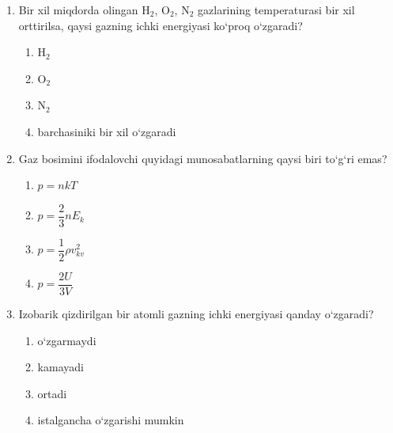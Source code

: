 \begin{enumerate}

\begin{enumerate}[label=\Alph*)]
\item 227
\item 375
\item 250
\item 500

\end{enumerate}

\item Bir xil miqdorda olingan H$_2$, O$_2$, N$_2$ gazlarining temperaturasi bir xil orttirilsa, qaysi gazning ichki energiyasi ko‘proq o‘zgaradi?
\begin{enumerate}[label=\Alph*)]
\item H$_2$
\item O$_2$
\item N$_2$
\item barchasiniki bir xil o‘zgaradi

\end{enumerate}

\item Gaz bosimini ifodalovchi quyidagi munosabatlarning qaysi biri to‘g‘ri emas?
\begin{enumerate}[label=\Alph*)]
\item $p=nkT$
\item $p=\dfrac{2}{3}nE_k$
\item $p=\dfrac{1}{2}\rho v_{kv}^2$
\item $p=\dfrac{2U}{3V}$

\end{enumerate}

\item Izobarik qizdirilgan bir atomli gazning ichki energiyasi qanday o‘zgaradi?
\begin{enumerate}[label=\Alph*)]
\item o‘zgarmaydi
\item kamayadi
\item ortadi
\item istalgancha o‘zgarishi mumkin

\end{enumerate}


\end{enumerate}
